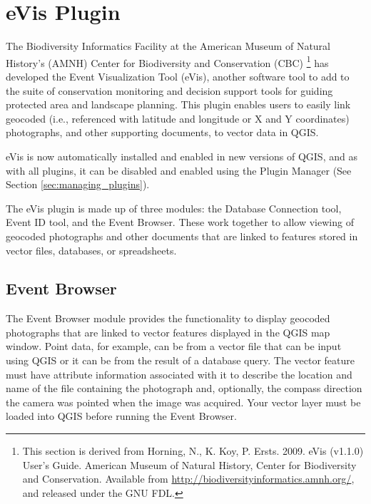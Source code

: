
\section{eVis Plugin}\label{sec:evis}

The Biodiversity Informatics Facility at the American Museum of Natural History's (AMNH) Center 
for Biodiversity and Conservation (CBC) \footnote{This section is derived from Horning, N., K.
Koy, P. Ersts. 2009. eVis (v1.1.0) User's Guide. American Museum of
Natural History, Center for Biodiversity and Conservation. Available from
\url{http://biodiversityinformatics.amnh.org/}, and released under the GNU FDL.} has developed the
Event Visualization Tool (eVis), 
another software tool to add to the suite of conservation monitoring and decision support tools 
for guiding protected area and landscape planning. This plugin enables users to easily link 
geocoded (i.e., referenced with latitude and longitude or X and Y coordinates) photographs, 
and other supporting documents, to vector data in QGIS.

eVis is now automatically installed and enabled in new versions of QGIS, and as with all plugins, 
it can be disabled and enabled using the Plugin Manager (See Section \ref{sec:managing_plugins}).

The eVis plugin is made up of three modules: the Database Connection tool, Event ID tool, and 
the Event Browser. These work together to allow viewing of geocoded photographs and other documents 
that are linked to features stored in vector files, databases, or spreadsheets.

\subsection{Event Browser}\label{evis_browser}

The Event Browser module provides the functionality to display geocoded photographs that are linked
to vector features displayed in the QGIS map window. Point data, for example, can be from a vector
file that can be input using QGIS or it can be from the result of a database query. The vector
feature must have attribute information associated with it to describe the location and name of the
file containing the photograph and, optionally, the compass direction the camera was pointed when
the image was acquired. Your vector layer must be loaded into QGIS before running the Event Browser.

\label{evis_launch_browser}

